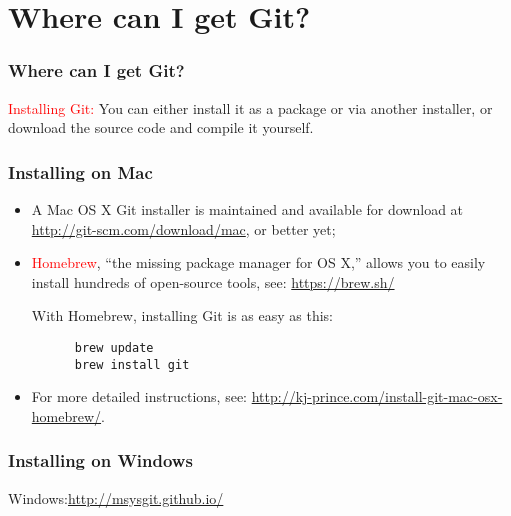 %
%
\section{
  Where can I get Git?
  }
%
%
\begin{frame}[fragile]
  \frametitle{
    Where can I get Git?
  }

  \textcolor{red}{Installing Git:} You can either install it as a package or via another installer, or download the source code and compile it yourself.

\end{frame}

%
%
\begin{frame}[fragile]
  \frametitle{
    Installing on Mac
  }
  \begin{itemize}%
  \item
    A Mac OS X Git installer is maintained and available for download at \href{http://git-scm.com/download/mac}{http://git-scm.com/download/mac}, or better yet;
  \item
    \textcolor{red}{Homebrew}, “the missing package manager for OS X,” allows you to easily install hundreds of open-source tools, see: \href{https://brew.sh/}{https://brew.sh/}

    \bigskip

    With Homebrew, installing Git is as easy as this:

    \begin{lstlisting}
      brew update
      brew install git
    \end{lstlisting}
    
  \item
    For more detailed instructions, see: \href{http://kj-prince.com/install-git-mac-osx-homebrew/}{http://kj-prince.com/install-git-mac-osx-homebrew/}.
  \end{itemize}

\end{frame}

%
%
\begin{frame}[fragile]
\frametitle{\bf
Installing on Windows
}

Windows:\href{http://msysgit.github.io/}{http://msysgit.github.io/}

\end{frame}

